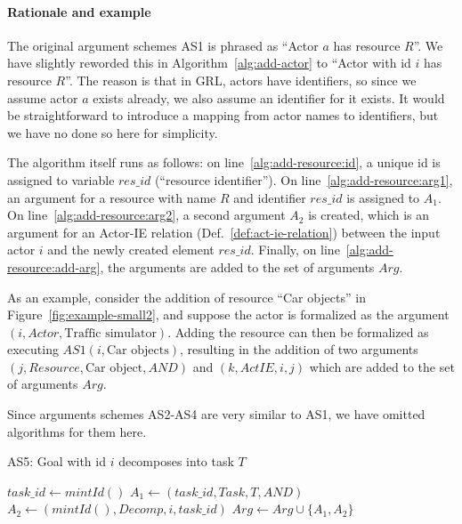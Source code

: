 \paragraph{Rationale and example} The original argument schemes AS1 is phrased as ``Actor $a$ has resource $R$''. We have slightly reworded this in Algorithm~\ref{alg:add-actor} to ``Actor with id $i$ has resource $R$''. The reason is that in GRL, actors have identifiers, so since we assume actor $a$ exists already, we also assume an identifier for it exists. It would be straightforward to introduce a mapping from actor names to identifiers, but we have no done so here for simplicity. 

The algorithm itself runs as follows: on line~\ref{alg:add-resource:id}, a unique id is assigned to variable $res\_id$ (``resource identifier''). On line~\ref{alg:add-resource:arg1}, an argument for a resource with name $R$ and identifier $res\_id$ is assigned to $A_1$. On line~\ref{alg:add-resource:arg2}, a second argument $A_2$ is created, which is an argument for an Actor-IE relation (Def.~\ref{def:act-ie-relation}) between the input actor $i$ and the newly created element $res\_id$. Finally, on line~\ref{alg:add-resource:add-arg}, the arguments are added to the set of arguments $Arg$.

As an example, consider the addition of resource ``Car objects'' in Figure~\ref{fig:example-small2}, and suppose the actor is formalized as the argument $(i, Actor, \text{Traffic simulator})$. Adding the resource can then be formalized as executing $AS1(i, \text{Car objects})$, resulting in the addition of two arguments $(j, Resource, \text{Car object}, AND)$ and $(k, ActIE, i, j)$ which are added to the set of arguments $Arg$.

Since arguments schemes AS2-AS4 are very similar to AS1, we have omitted algorithms for them here.

\begin{algorithm}[h]
  \caption{AS5: Goal with id $i$ decomposes into task $T$}\label{alg:add-decomp}
  \begin{algorithmic}[1]
    \State $task\_id\gets mintId()$\label{alg:add-decomp:task-id}
    \State $A_1\leftarrow (task\_id, Task, T, AND)$\label{alg:add-decomp:arg1}
    \State $A_2\leftarrow (mintId(), Decomp, i, task\_id)$\label{alg:add-decomp:arg2}
    \State $Arg\gets Arg\cup \{A_1,A_2\}$\label{alg:add-decomp:add-arg}
    \EndProcedure
  \end{algorithmic}
\end{algorithm}

